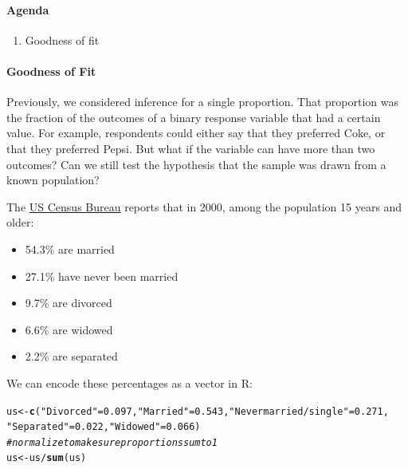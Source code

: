 \documentclass[10pt]{article}\usepackage[]{graphicx}\usepackage[]{color}
\makeatletter
\newcommand{\hlnum}[1]{\textcolor[rgb]{0.686,0.059,0.569}{#1}}%
\newcommand{\hlstr}[1]{\textcolor[rgb]{0.192,0.494,0.8}{#1}}%
\newcommand{\hlcom}[1]{\textcolor[rgb]{0.678,0.584,0.686}{\textit{#1}}}%
\newcommand{\hlopt}[1]{\textcolor[rgb]{0,0,0}{#1}}%
\newcommand{\hlstd}[1]{\textcolor[rgb]{0.345,0.345,0.345}{#1}}%
\newcommand{\hlkwb}[1]{\textcolor[rgb]{0.69,0.353,0.396}{#1}}%
\newcommand{\hlkwd}[1]{\textcolor[rgb]{0.737,0.353,0.396}{\textbf{#1}}}%
\newenvironment{kframe}{%
 \def\at@end@of@kframe{}%
 \ifinner\ifhmode%
  \def\at@end@of@kframe{\end{minipage}}%
  \begin{minipage}{\columnwidth}%
 \fi\fi%
 \def\FrameCommand##1{\hskip\@totalleftmargin \hskip-\fboxsep
 \colorbox{shadecolor}{##1}\hskip-\fboxsep
     \hskip-\linewidth \hskip-\@totalleftmargin \hskip\columnwidth}%
 \MakeFramed {\advance\hsize-\width
   \@totalleftmargin\z@ \linewidth\hsize
   \@setminipage}}%
 {\par\unskip\endMakeFramed%
 \at@end@of@kframe}
\newenvironment{knitrout}{}{} %
\newcommand{\R}{{\sf R}\xspace}
\makeatother
\begin{document}
\paragraph{Agenda}
\begin{enumerate}
  \itemsep0em
  \item Goodness of fit
\end{enumerate}

\paragraph{Goodness of Fit}

Previously, we considered inference for a single proportion. That proportion was the fraction of the outcomes of a binary response variable that had a certain value. For example, respondents could either say that they preferred Coke, or that they preferred Pepsi. But what if the variable can have more than two outcomes? Can we still test the hypothesis that the sample was drawn from a known population? 

The \href{https://www.census.gov/prod/2003pubs/c2kbr-30.pdf}{US Census Bureau} reports that in 2000, among the population 15 years and older:
\begin{itemize}
  \itemsep0in
  \item 54.3\% are married
  \item 27.1\% have never been married
  \item 9.7\% are divorced
  \item 6.6\% are widowed
  \item 2.2\% are separated
\end{itemize}

We can encode these percentages as a vector in \R:

\begin{knitrout}
\color{fgcolor}\begin{kframe}
\begin{alltt}
\hlstd{us} \hlkwb{<-} \hlkwd{c}\hlstd{(}\hlstr{"Divorced"} \hlstd{=} \hlnum{0.097}\hlstd{,} \hlstr{"Married"} \hlstd{=} \hlnum{0.543}\hlstd{,} \hlstr{"Never married/single"} \hlstd{=} \hlnum{0.271}\hlstd{,}
        \hlstr{"Separated"} \hlstd{=} \hlnum{0.022}\hlstd{,} \hlstr{"Widowed"} \hlstd{=} \hlnum{0.066}\hlstd{)}
\hlcom{# normalize to make sure proportions sum to 1}
\hlstd{us} \hlkwb{<-} \hlstd{us} \hlopt{/} \hlkwd{sum}\hlstd{(us)}
\end{alltt}
\end{kframe}
\end{knitrout}
\end{document}
